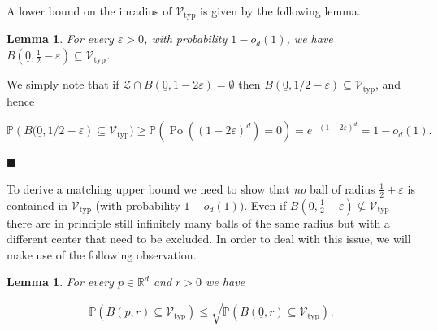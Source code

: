 \documentclass[11pt]{article}%
\newenvironment{proof}{\vspace{1ex}\noindent{\bf Proof.}}{\hspace*{\fill}$\blacksquare$\vspace{1ex}}
\newtheorem{lemma} [theorem] {Lemma}%
\newcommand{\Vcal}[0]{\ensuremath{{\mathcal V}}}
\newcommand{\Zcal}[0]{\ensuremath{{\mathcal Z}}}
\newcommand{\eR}[0]{\ensuremath{ \mathbb R}}
\newcommand{\Pee}[0]{\ensuremath{{\mathbb P}}}
\newcommand{\eps}{\varepsilon}
\newcommand{\orig}{\underline{0}}
\DeclareMathOperator{\Po}{Po}
\newcommand{\Vtyp}[0]{\Vcal_{\text{typ}}}
\begin{document}
A lower bound on the inradius of $\Vtyp$ is given by the following lemma.

\begin{lemma}
For every $\eps>0$, with probability $1-o_d(1)$, we have $B(\orig,\frac12-\eps) \subseteq \Vtyp$.
\end{lemma}

\begin{proof}
We simply note that if $\Zcal \cap B(\orig,1-2\eps) = \emptyset$ then $B(\orig,1/2-\eps) \subseteq \Vtyp$, and
hence 

$$ \Pee\left( B(\orig,1/2-\eps\right) \subseteq \Vtyp ) \geq 
\Pee( \Po( (1-2\eps)^d ) = 0 ) = e^{-(1-2\eps)^d} = 1-o_d(1). $$

\end{proof}

To derive a matching upper bound we need to show that {\em no} ball of radius $\frac12 + \eps$ is contained in $\Vtyp$
(with probability $1-o_d(1)$). 
Even if $B(\orig,\frac12+\eps) \not\subseteq \Vtyp$ there are in principle still infinitely
many balls of the same radius but with a different center that need to be excluded.
In order to deal with this issue, we will make use of the following observation.

\begin{lemma}
For every $p \in \eR^d$ and $r>0$ we have

$$ \Pee( B(p,r) \subseteq \Vtyp) \leq \sqrt{\Pee( B(\orig,r) \subseteq \Vtyp )}. $$

\end{lemma}
\end{document}
